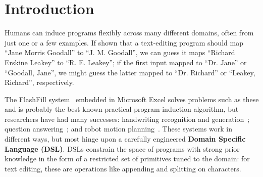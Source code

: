 \documentclass{article}
\newcommand{\system}{\textsc{DreamCoder}~}
\begin{document}

\section{Introduction}


Humans can induce programs flexibly across many different domains, often from just one or a few examples.  If
shown that a text-editing program should map ``Jane Morris Goodall''
to ``J. M. Goodall'', we can guess it maps ``Richard Erskine Leakey''
to ``R. E. Leakey''; if the first input mapped to
``Dr. Jane'' or ``Goodall, Jane'', we might guess
the latter mapped to ``Dr. Richard'' or ``Leakey, Richard'',
 respectively.

The FlashFill system~\cite{gulwani2011automating} embedded in
Microsoft Excel solves problems such as these and is probably the best
known practical program-induction algorithm, but researchers %
have had many successes: handwriting recognition and
generation~\cite{lake2015human}; question
answering~\cite{johnson2017clevr}; and robot motion
planning~\cite{devlin2017neural}.  These systems
work in different ways, but most hinge upon a carefully engineered
\textbf{Domain Specific Language (DSL)}.  %
DSLs constrain the space
of programs with strong prior knowledge in the form of a restricted
set of primitives tuned to the domain: for
text editing, these are operations like appending and
splitting on characters.
\end{document}

